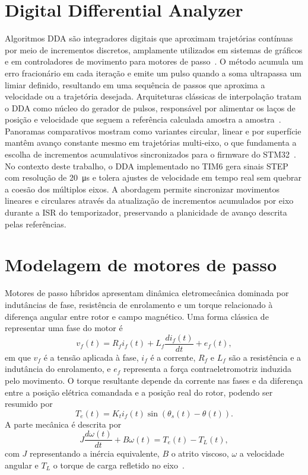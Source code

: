 \section{Digital Differential Analyzer}

Algoritmos DDA são integradores digitais que aproximam trajetórias
contínuas por meio de incrementos discretos, amplamente utilizados em
sistemas de gráficos e em controladores de movimento para motores de
passo~\cite{fussell2003}. O método acumula um erro fracionário em cada
iteração e emite um pulso quando a soma ultrapassa um limiar definido,
resultando em uma sequência de passos que aproxima a velocidade ou a
trajetória desejada. Arquiteturas clássicas de interpolação tratam o DDA
como núcleo do gerador de pulsos, responsável por alimentar os laços de
posição e velocidade que seguem a referência calculada amostra a
amostra~\cite{idc_cnc_interp,koren_reference,efficient_reference,unit3_interpolators}.
Panoramas comparativos mostram como variantes circular, linear e por
superfície mantêm avanço constante mesmo em trajetórias multi-eixo, o
que fundamenta a escolha de incrementos acumulativos sincronizados para o
firmware do STM32~\cite{koren_cnc_interpolators}. No contexto deste
trabalho, o DDA implementado no TIM6 gera sinais STEP com resolução de
\SI{20}{\micro\second} e tolera ajustes de velocidade em tempo real sem
quebrar a coesão dos múltiplos eixos. A abordagem permite sincronizar
movimentos lineares e circulares através da atualização de incrementos
acumulados por eixo durante a ISR do temporizador, preservando a
planicidade de avanço descrita pelas referências.

\section{Modelagem de motores de passo}

Motores de passo híbridos apresentam dinâmica eletromecânica dominada
por indutâncias de fase, resistência de enrolamento e um torque
relacionado à diferença angular entre rotor e campo magnético. Uma forma
clássica de representar uma fase do motor é
\begin{equation}
    v_f(t) = R_f i_f(t) + L_f \frac{di_f(t)}{dt} + e_f(t),
\end{equation}
em que $v_f$ é a tensão aplicada à fase, $i_f$ é a corrente, $R_f$ e
$L_f$ são a resistência e a indutância do enrolamento, e $e_f$ representa
a força contraeletromotriz induzida pelo movimento. O torque resultante
depende da corrente nas fases e da diferença entre a posição elétrica
comandada e a posição real do rotor, podendo ser resumido por
\begin{equation}
    T_e(t) = K_t i_f(t) \sin(\theta_s(t)-\theta(t)).
\end{equation}
A parte mecânica é descrita por
\begin{equation}
    J\frac{d\omega(t)}{dt} + B\omega(t) = T_e(t) - T_L(t),
\end{equation}
com $J$ representando a inércia equivalente, $B$ o atrito viscoso,
$\omega$ a velocidade angular e $T_L$ o torque de carga
refletido no eixo~\cite{kenjo1994}.

